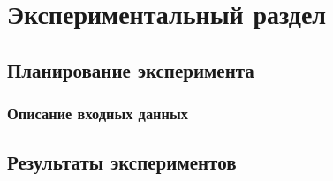 \chapter{Экспериментальный раздел}
\label{sec:experiment}

\section{Планирование эксперимента}

\subsection{Описание входных данных}

\section{Результаты экспериментов}

